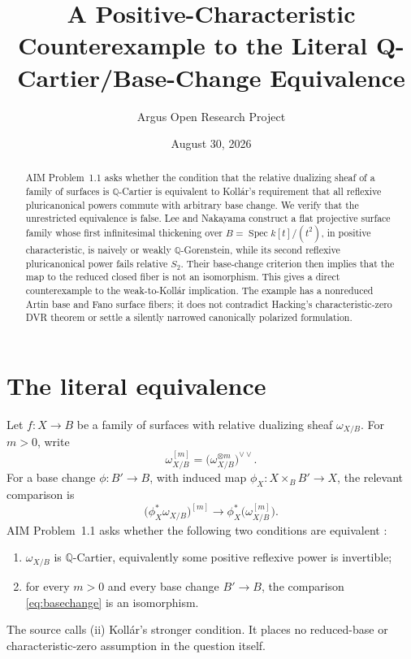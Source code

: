 \documentclass[10pt,reqno]{amsart}
\title[A counterexample to a Q-Gorenstein base-change equivalence]
{A Positive-Characteristic Counterexample to the Literal Q-Cartier/Base-Change Equivalence}
\author{Argus Open Research Project}
\date{August 30, 2026}
\theoremstyle{definition}
\begin{document}
\begin{abstract}
AIM Problem~1.1 asks whether the condition that the relative dualizing sheaf of a family of surfaces is $\mathbb Q$-Cartier is equivalent to Koll\'ar's requirement that all reflexive pluricanonical powers commute with arbitrary base change. We verify that the unrestricted equivalence is false. Lee and Nakayama construct a flat projective surface family whose first infinitesimal thickening over $B=\operatorname{Spec}k[t]/(t^2)$, in positive characteristic, is naively or weakly $\mathbb Q$-Gorenstein, while its second reflexive pluricanonical power fails relative $S_2$. Their base-change criterion then implies that the map to the reduced closed fiber is not an isomorphism. This gives a direct counterexample to the weak-to-Koll\'ar implication. The example has a nonreduced Artin base and Fano surface fibers; it does not contradict Hacking's characteristic-zero DVR theorem or settle a silently narrowed canonically polarized formulation.
\end{abstract}

\maketitle

\section{The literal equivalence}

Let $f:X\to B$ be a family of surfaces with relative dualizing sheaf $\omega_{X/B}$. For $m>0$, write
\[
  \omega_{X/B}^{[m]}=\bigl(\omega_{X/B}^{\otimes m}\bigr)^{\vee\vee}.
\]
For a base change $\phi:B'\to B$, with induced map $\phi_X:X\times_BB'\to X$, the relevant comparison is
\begin{equation}\label{eq:basechange}
  \bigl(\phi_X^*\omega_{X/B}\bigr)^{[m]}
  \longrightarrow
  \phi_X^*\bigl(\omega_{X/B}^{[m]}\bigr).
\end{equation}
AIM Problem~1.1 asks whether the following two conditions are equivalent \cite{VanOpstall}:
\begin{enumerate}[label=\textup{(\roman*)}]
  \item $\omega_{X/B}$ is $\mathbb Q$-Cartier, equivalently some positive reflexive power is invertible;
  \item for every $m>0$ and every base change $B'\to B$, the comparison \eqref{eq:basechange} is an isomorphism.
\end{enumerate}
The source calls (ii) Koll\'ar's stronger condition. It places no reduced-base or characteristic-zero assumption in the question itself.
\end{document}
